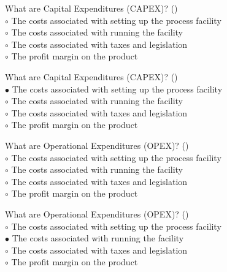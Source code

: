 \documentclass[]{beamer}
\begin{document}
\begin{CJK}{UTF8}{gbsn}
\begin{frame}[shrink] {}
\addtocounter{questions}{1}
\color{blue}
What are Capital Expenditures (CAPEX)?
({})\\
\color{black}
\setlength{\parindent}{-0.4cm}
{\color{red}$\circ$}  The costs associated with setting up the process facility  \\
{\color{red}$\circ$} The costs associated with running the facility  \\
{\color{red}$\circ$} The costs associated with taxes and legislation  \\
{\color{red}$\circ$} The profit margin on the product  \\
\end{frame}
\begin{frame}[shrink] {}
\addtocounter{answers}{1}
\color{blue}
What are Capital Expenditures (CAPEX)?
({})\\
\color{black}
\setlength{\parindent}{-0.4cm}
{\color{red}$\bullet$} The costs associated with setting up the process facility  \\
{\color{red}$\circ$} The costs associated with running the facility  \\
{\color{red}$\circ$} The costs associated with taxes and legislation  \\
{\color{red}$\circ$} The profit margin on the product  \\
\end{frame}


\begin{frame}[shrink] {}
\addtocounter{questions}{1}
\color{blue}
What are Operational Expenditures (OPEX)?
({})\\
\color{black}
\setlength{\parindent}{-0.4cm}
{\color{red}$\circ$} The costs associated with setting up the process facility  \\
{\color{red}$\circ$}  The costs associated with running the facility  \\
{\color{red}$\circ$} The costs associated with taxes and legislation  \\
{\color{red}$\circ$} The profit margin on the product  \\
\end{frame}
\begin{frame}[shrink] {}
\addtocounter{answers}{1}
\color{blue}
What are Operational Expenditures (OPEX)?
({})\\
\color{black}
\setlength{\parindent}{-0.4cm}
{\color{red}$\circ$} The costs associated with setting up the process facility  \\
{\color{red}$\bullet$} The costs associated with running the facility  \\
{\color{red}$\circ$} The costs associated with taxes and legislation  \\
{\color{red}$\circ$} The profit margin on the product  \\
\end{frame}



\end{CJK}
\end{document}
